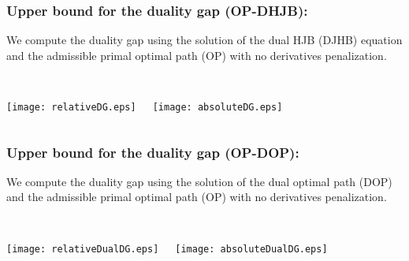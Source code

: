 \begin{frame}
\frametitle{Upper bound for the duality gap (OP-DHJB):}

We compute the duality gap using the solution of the dual HJB (DJHB) equation and the admissible primal optimal path (OP) with no derivatives penalization.\\
\quad\\
\begin{columns}[c]

{\texttt{[image: relativeDG.eps]}}

{\texttt{[image: absoluteDG.eps]}}

\end{columns}  
 
\end{frame}

\begin{frame}
\frametitle{Upper bound for the duality gap (OP-DOP):}

We compute the duality gap using the solution of the dual optimal path (DOP) and the admissible primal optimal path (OP) with no derivatives penalization.\\
\quad\\ 
\begin{columns}[c]

{\texttt{[image: relativeDualDG.eps]}}

{\texttt{[image: absoluteDualDG.eps]}}

\end{columns} 
 
\end{frame}